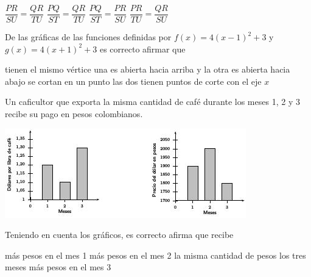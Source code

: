 \documentclass[10pt,addpoints]{exam}
\begin{document}
\begin{questions}
\begin{oneparchoices}
  \choice $\dfrac{PR}{SU}=\dfrac{QR}{TU}$
  \CorrectChoice $\dfrac{PQ}{ST}=\dfrac{QR}{TU}$
  \choice $\dfrac{PQ}{ST}=\dfrac{PR}{SU}$
  \choice $\dfrac{PR}{TU}=\dfrac{QR}{SU}$
\end{oneparchoices}
\question De las gráficas de las funciones definidas por $f(x)=4(x-1)^{2}+3$ y $g(x)=4(x+1)^{2}+3$ es correcto afirmar que
\begin{choices}
  \choice tienen el mismo vértice
  \choice una es abierta hacia arriba y la otra es abierta hacia abajo
  \CorrectChoice se cortan en un punto
  \choice las dos tienen puntos de corte con el eje $x$
\end{choices}
\question Un caficultor que exporta la misma cantidad de café durante los meses 1, 2 y 3 recibe su pago en pesos colombianos.
\begin{center}
 \includegraphics{./Images/cafe.jpg}
\end{center}
Teniendo en cuenta los gráficos, es correcto afirma que recibe
\begin{choices}
 \choice más pesos en el mes 1
 \choice más pesos en el mes 2
 \choice la misma cantidad de pesos los tres meses
 \CorrectChoice más pesos en el mes 3
\end{choices}

\end{questions}
\end{document}
